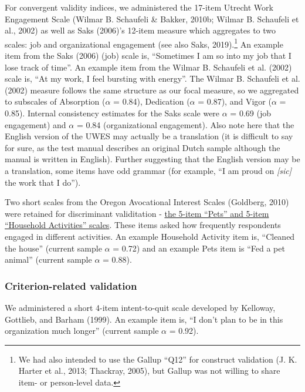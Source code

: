 \documentclass[
  man]{apa6}
\begin{document}
For convergent validity indices, we administered the 17-item Utrecht Work Engagement Scale (Wilmar B. Schaufeli \& Bakker, 2010b; Wilmar B. Schaufeli et al., 2002) as well as Saks (2006)'s 12-item measure which aggregates to two scales: job and organizational engagement (see also Saks, 2019).\footnote{We had also intended to use the Gallup ``Q12'' for construct validation (J. K. Harter et al., 2013; Thackray, 2005), but Gallup was not willing to share item- or person-level data.}
An example item from the Saks (2006) (job) scale is, ``Sometimes I am so into my job that I lose track of time''. An example item from the Wilmar B. Schaufeli et al. (2002) scale is, ``At my work, I feel bursting with energy''. The Wilmar B. Schaufeli et al. (2002) measure follows the same structure as our focal measure, so we aggregated to subscales of Absorption (\(\alpha\) = 0.84), Dedication (\(\alpha\) = 0.87), and Vigor (\(\alpha\) = 0.85). Internal consistency estimates for the Saks scale were \(\alpha\) = 0.69 (job engagement) and \(\alpha\) = 0.84 (organizational engagement). Also note here that the English version of the UWES may actually be a translation (it is difficult to say for sure, as the test manual describes an original Dutch sample although the manual is written in English). Further suggesting that the English version may be a translation, some items have odd grammar (for example, ``I am proud on \emph{{[}sic{]}} the work that I do'').

Two short scales from the Oregon Avocational Interest Scales (Goldberg, 2010) were retained for discriminant validitation - \href{https://ipip.ori.org/newORAISKey.htm\#Food-Related}{the 5-item ``Pets'' and 5-item ``Household Activities'' scales}. These items asked how frequently respondents engaged in different activities. An example Household Activity item is, ``Cleaned the house'' (current sample \(\alpha\) = 0.72) and an example Pets item is ``Fed a pet animal'' (current sample \(\alpha\) = 0.88).

\hypertarget{criterion-related-validation}{%
\subsubsection{Criterion-related validation}\label{criterion-related-validation}}

We administered a short 4-item intent-to-quit scale developed by Kelloway, Gottlieb, and Barham (1999). An example item is, ``I don't plan to be in this organization much longer'' (current sample \(\alpha\) = 0.92).
\end{document}
